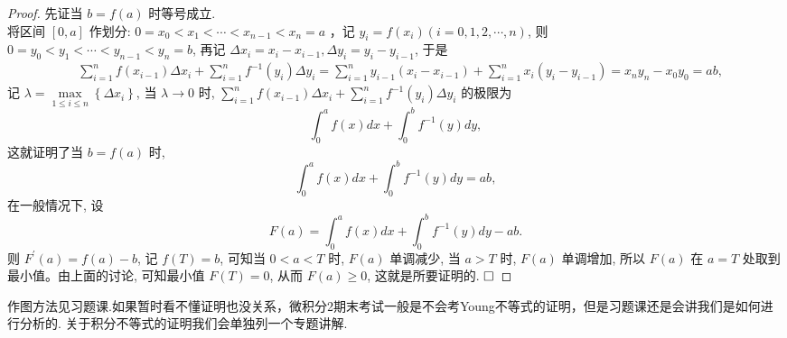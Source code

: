 \documentclass[lang=cn,newtx,10pt,scheme=chinese]{elegantbook}
\begin{document}
\begin{enumerate}
\begin{proof}
	  先证当 $b=f(a)$ 时等号成立.\\
	将区间 $[0, a]$ 作划分: $0=x_0<x_1<\cdots<x_{n-1}<x_n=a$ ，记
	$y_i=f\left(x_i\right)(i=0,1,2, \cdots, n)$, 则\\ $0=y_0<y_1<\cdots<y_{n-1}<y_n=b$, 再记
	$\Delta x_i=x_i-x_{i-1}, \Delta y_i=y_i-y_{i-1}$, 于是
	$$
	\begin{aligned}
		& \sum_{i=1}^n f\left(x_{i-1}\right) \Delta x_i+\sum_{i=1}^n f^{-1}\left(y_i\right) \Delta y_i=\sum_{i=1}^n y_{i-1}\left(x_i-x_{i-1}\right)+\sum_{i=1}^n x_i\left(y_i-y_{i-1}\right)  =x_n y_n-x_0 y_0=a b,
	\end{aligned}
	$$
	记 $\lambda=\max\limits _{1 \leq i \leq n}\left\{\Delta x_i\right\}$, 当 $\lambda \rightarrow 0$ 时, $\sum_{i=1}^n f\left(x_{i-1}\right) \Delta x_i+\sum_{i=1}^n f^{-1}\left(y_i\right) \Delta y_i$ 的极限为\\
	$$
	\int_0^a f(x) d x+\int_0^b f^{-1}(y) d y,
	$$
	这就证明了当 $b=f(a)$ 时, $$\int_0^a f(x) d x+\int_0^b f^{-1}(y) d y=a b,$$ 
	 在一般情况下, 设 $$F(a)=\int_0^a f(x) d x+\int_0^b f^{-1}(y) d y-a b.$$则 $F^{\prime}(a)=f(a)-b$, 记 $f(T)=b$, 可知当 $0<a<T$ 时, $F(a)$ 单调减少, 当 $a>T$ 时, $F(a)$ 单调增加, 所以 $F(a)$ 在 $a=T$ 处取到最小值。由上面的讨论, 可知最小值 $F(T)=0$, 从而 $F(a) \geq 0$, 这就是所要证明的.
	 $\hfill\square$
\end{proof}
{\color{purple}作图方法见习题课.如果暂时看不懂证明也没关系，微积分2期末考试一般是不会考Young不等式的证明，但是习题课还是会讲我们是如何进行分析的. 关于积分不等式的证明我们会单独列一个专题讲解.}
\end{enumerate}
\end{document}
